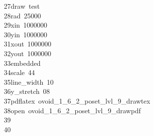 \begin{tabbing}
27\>\>\>draw\ test\ \\[0pt]
28\>\>\>rad\ 25000\ \\[0pt]
29\>\>\>xin\ 1000000\ \\[0pt]
30\>\>\>yin\ 1000000\ \\[0pt]
31\>\>\>xout\ 1000000\ \\[0pt]
32\>\>\>yout\ 1000000\ \\[0pt]
33\>\>\>embedded\ \\[0pt]
34\>\>\>scale\ 44\ \\[0pt]
35\>\>\>line\_width\ 10\ \\[0pt]
36\>\>\>y\_stretch\ 08\ \\[0pt]
37\>\>pdflatex\ ovoid\_1\_6\_2\_poset\_lvl\_9\_drawtex\\[0pt]
38\>\>open\ ovoid\_1\_6\_2\_poset\_lvl\_9\_drawpdf\\[0pt]
39\>\\[0pt]
40\>\end{tabbing}
